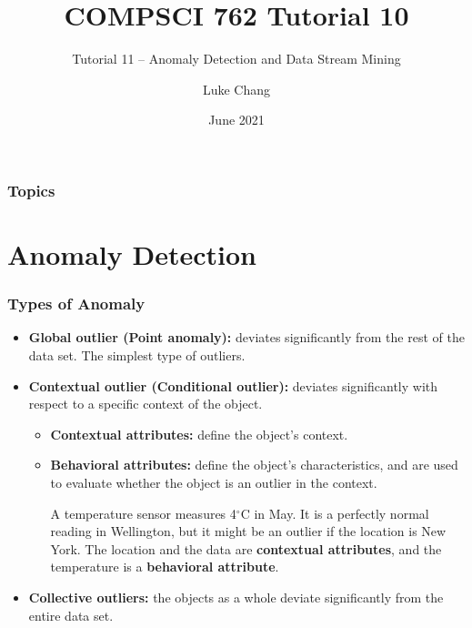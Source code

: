 \documentclass[aspectratio=169, 10pt]{beamer}
\title{COMPSCI 762 Tutorial 10}
\subtitle{Tutorial 11 -- Anomaly Detection and Data Stream Mining}
\author{Luke Chang}
\institute{The University of Auckland}
\date{June 2021}
\begin{document}
\frame{\titlepage}

\begin{frame}
    \frametitle{Topics}

    \tableofcontents
        
\end{frame}

\section{Anomaly Detection}
\begin{frame}
\frametitle{Types of Anomaly}

\begin{itemize}
    \item \textbf{Global outlier (Point anomaly):} deviates significantly from the rest of the data set. 
    The simplest type of outliers.
    \item \textbf{Contextual outlier (Conditional outlier):} deviates significantly with respect to a specific context of the object.
        \begin{itemize}
            \item \textbf{Contextual attributes:} define the object’s context.
            \item \textbf{Behavioral attributes:} define the object’s characteristics, and are used to evaluate
            whether the object is an outlier in the context.
        \begin{example}
            A temperature sensor measures 4$^{\circ}$C in May. It is a perfectly normal reading in Wellington, but it might be an outlier if the location is New York.
            The location and the data are \textbf{contextual attributes}, and the temperature is a \textbf{behavioral attribute}.
        \end{example}
    \end{itemize}
    \item \textbf{Collective outliers:} the objects as a whole deviate significantly from the entire data set.
\end{itemize}

\end{frame}
\end{document}
